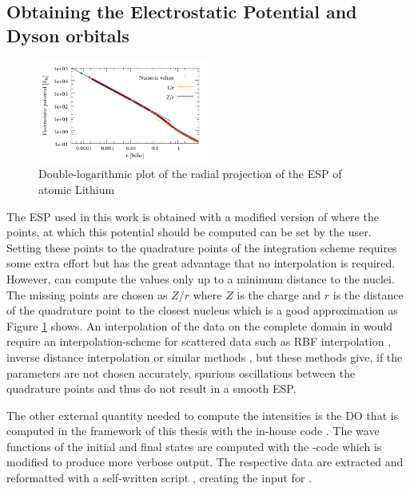 \subsection{Obtaining the Electrostatic Potential and Dyson orbitals}
\begin{figure}
\includegraphics[width=0.5\textwidth]{Figures/ESP}
\caption{Double-logarithmic plot of the radial projection of the ESP of atomic Lithium}
\label{fig:esp}
\end{figure}
The ESP used in this work is obtained with a modified version of  \cite{nwchem} where the points, at which this potential should be computed can be set by the user.
Setting these points to the quadrature points of the integration scheme requires some extra effort but has the great advantage that no interpolation is required.
However,  can compute the values only up to a minimum distance to the nuclei.
The missing points are chosen as $Z/r$ where $Z$ is the charge and $r$ is the distance of the quadrature point to the closest nucleus which is a good approximation as Figure \ref{fig:esp} shows.
An interpolation of the data on the complete domain in  \cite{FreeWilly} would require an interpolation-scheme for scattered data such as RBF interpolation \cite{rbfSE,rbfInterpol,rbfSurf}, inverse distance interpolation \cite{adapt_idw,idw} or similar methods \cite{CompInterp,idw_krieging,interpol}, but these methods give, if the parameters are not chosen accurately, spurious oscillations between the quadrature points and thus do not result in a smooth ESP.

The other external quantity needed to compute the intensities is the DO that is computed in the framework of this thesis with the in-house code  \cite{MAgg}.
The wave functions of the initial and final states are computed with the -code which is modified to produce more verbose output.
The respective data are extracted and reformatted with a self-written script \cite{nwc2dy}, creating the input for .

